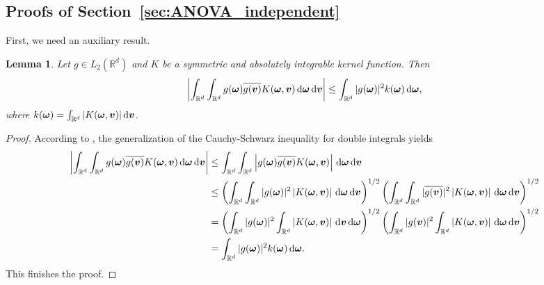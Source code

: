 \documentclass{article}
\renewcommand{\vec}[1]{\ensuremath \mathbf{\boldsymbol{#1}}}
\newcommand{\w}{\ensuremath{\vec \omega}}
\newcommand{\R}{\ensuremath{\mathbb{R}}}
\renewcommand{\d}{\, \mathrm{d}}
\newtheorem{lemma}[theorem]{Lemma}
\theoremstyle{definition}
\newenvironment{Lemma}{ \begin{lemma}\normalfont\slshape}{\end{lemma}}
\numberwithin{equation}{section}
\begin{document}
\subsection*{Proofs of Section~\ref{sec:ANOVA_independent}}\label{sec:proofs}
First, we need an auxiliary result.
\begin{Lemma}\label{lem:cauchy_double}
Let $g\in L_2(\R^d)$ and $K$ be a symmetric and absolutely integrable kernel function. Then  
$$\left|\int_{\R^d}\int_{\R^d} g(\w) \overline{g(\vec v)} K(\w,\vec v) \d \w \d\vec v \right|\leq \int_{\R^d} |g(\w) |^2 k(\w) \d\w, $$
where $k(\w) = \int_{\R^d} |K(\w,\vec v)|\d \vec v$.
\end{Lemma}
\begin{proof}
According to \cite[Chapter 1]{St04}, the generalization of the Cauchy-Schwarz inequality for double integrals yields
 \begin{align*}
\left| \int_{\R^d}\int_{\R^d} g(\w) \overline{g(\vec v)} K(\w,\vec v) \d\w\d\vec v \right|
&\leq \int_{\R^d}\int_{\R^d} \left|g(\w) \overline{g(\vec v)} K(\w,\vec v) \right|\d\w\d\vec v \\  
&\leq
\left(\int_{\R^d}\int_{\R^d} |g(\w)|^2 \left|K(\w,\vec v) \right|\d\w \d\vec v \right)^{1/2}
\left(\int_{\R^d}\int_{\R^d} |\overline{g(\vec v)}|^2\left|K(\w,\vec v) \right|\d \w \d\vec v \right)^{1/2}\\
 &= \left(\int_{\R^d} |g(\w)|^2 \int_{\R^d}\left|K(\w,\vec v) \right| \d\vec v \d \w  \right)^{1/2}
\left(\int_{\R^d} |g(\vec v)|^2 \int_{\R^d} \left|K(\w,\vec v) \right| \d \w \d\vec v \right)^{1/2}\\
 &= \int_{\R^d} |g(\w)|^2k(\w)  \d\w  .
\end{align*}
This finishes the proof.
\end{proof}
\end{document}

